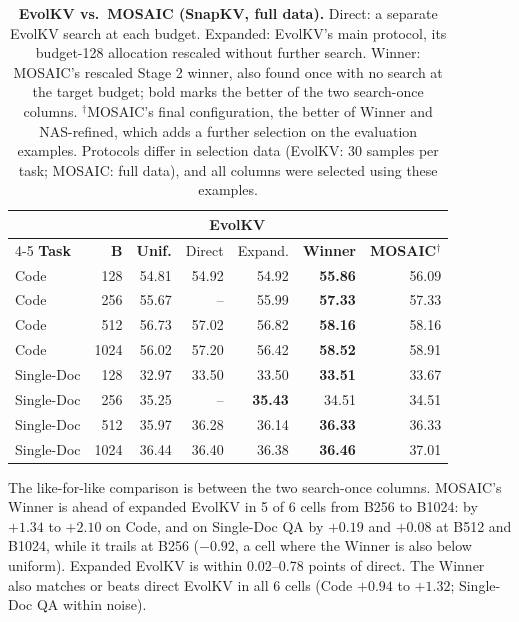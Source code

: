 \documentclass[11pt]{article}
\begin{document}
\begin{table}[t]
  \centering
  \footnotesize
  \setlength{\tabcolsep}{1.5pt}
  \begin{tabular}{@{} l r r r r r r @{}}
    \toprule
    & & & \multicolumn{2}{c}{\textbf{EvolKV}} & & \\
    \cmidrule(lr){4-5}
    \textbf{Task} & \textbf{B} & \textbf{Unif.} & Direct & Expand. & \textbf{Winner} & \textbf{MOSAIC}$^\dagger$ \\
    \midrule
    \rowcolor{gray!10}
    Code       & 128  & 54.81 & 54.92 & 54.92 & \textbf{55.86} & 56.09 \\
    Code       & 256  & 55.67 & --    & 55.99 & \textbf{57.33} & 57.33 \\
    \rowcolor{gray!10}
    Code       & 512  & 56.73 & 57.02 & 56.82 & \textbf{58.16} & 58.16 \\
    Code       & 1024 & 56.02 & 57.20 & 56.42 & \textbf{58.52} & 58.91 \\
    \rowcolor{gray!10}
    Single-Doc & 128  & 32.97 & 33.50 & 33.50 & \textbf{33.51} & 33.67 \\
    Single-Doc & 256  & 35.25 & --    & \textbf{35.43} & 34.51 & 34.51 \\
    \rowcolor{gray!10}
    Single-Doc & 512  & 35.97 & 36.28 & 36.14 & \textbf{36.33} & 36.33 \\
    Single-Doc & 1024 & 36.44 & 36.40 & 36.38 & \textbf{36.46} & 37.01 \\
    \bottomrule
  \end{tabular}
  \caption{\textbf{EvolKV vs.\ MOSAIC (SnapKV, full data).} Direct: a separate EvolKV search at each budget. Expanded: EvolKV's main protocol, its budget-128 allocation rescaled without further search. Winner: MOSAIC's rescaled Stage 2 winner, also found once with no search at the target budget; bold marks the better of the two search-once columns. $^\dagger$MOSAIC's final configuration, the better of Winner and NAS-refined, which adds a further selection on the evaluation examples. Protocols differ in selection data (EvolKV: 30 samples per task; MOSAIC: full data), and all columns were selected using these examples.}
  \label{tab:ablation}
\end{table}

The like-for-like comparison is between the two search-once columns. MOSAIC's Winner is ahead of expanded EvolKV in 5 of 6 cells from B256 to B1024: by $+1.34$ to $+2.10$ on Code, and on Single-Doc QA by $+0.19$ and $+0.08$ at B512 and B1024, while it trails at B256 ($-0.92$, a cell where the Winner is also below uniform). Expanded EvolKV is within 0.02--0.78 points of direct. The Winner also matches or beats direct EvolKV in all 6 cells (Code $+0.94$ to $+1.32$; Single-Doc QA within noise). 
\end{document}
